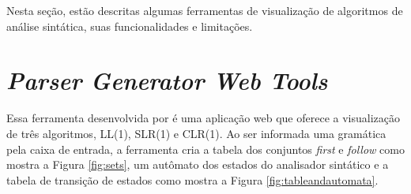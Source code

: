 \label{cap:trabalhos-relacionados}

Nesta seção, estão descritas algumas ferramentas de visualização de algoritmos de análise sintática, suas funcionalidades e limitações.

\section{\textit{Parser Generator Web Tools}}
\label{sec:trabalho-relacionado-a}

Essa ferramenta desenvolvida por \textcite{Parser-2024-04-12} é uma aplicação web que oferece a visualização de três algoritmos, LL(1), SLR(1) e CLR(1). Ao ser informada uma gramática pela caixa de entrada, a ferramenta cria a tabela dos conjuntos \textit{first} e \textit{follow} como mostra a Figura \ref{fig:sets}, um autômato dos estados do analisador sintático e a tabela de transição de estados como mostra a Figura \ref{fig:tableandautomata}.
\begin{figure}[htp]
    \captionsetup{width=16cm}
\end{figure}
